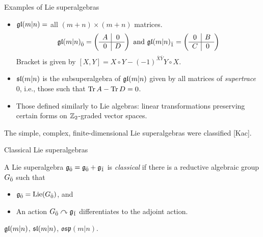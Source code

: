 \documentclass{beamer}
\begin{document}
\begin{frame}{Examples of Lie superalgebras}
  \begin{itemize}
    \pause
  \item $\gl(m|n) = $ all $(m+n) \times (m+n)$ matrices.
    \[
\even{\gl(m|n)} = \left(
  \begin{array}{c|c}
    A & 0 \\
    \hline
    0 & D
  \end{array}
\right)
\text{ and } \odd{\gl(m|n)} = \left(
  \begin{array}{c|c}
    0 & B \\
    \hline
    C & 0
  \end{array}
\right)
\]
\pause
  Bracket is given by $[X,Y] = X \circ Y - (-1)^{\bar X \bar Y} Y \circ X$.
  \pause\item $\sl(m|n)$ is the subsuperalgebra of $\gl(m|n)$ given by all matrices of \emph{supertrace} 0, i.e., those such that $\Tr A - \Tr D = 0$.
  \pause\item Those defined similarly to Lie algebras: linear transformations preserving certain forms on $\ZZ_2$-graded vector spaces.
  \end{itemize}
\pause
  The simple, complex, finite-dimensional Lie superalgebras were classified [Kac].
\end{frame}

\begin{frame}{Classical Lie superalgebras}\pause
  \begin{definition}
  A Lie superalgebra $\even{\g} = \even{\g} +\odd{\g}$ is \emph{classical} if there is a reductive algebraic group $\even{G}$ such that
  \begin{itemize}
  \item $\even{\g} = \Lie(\even{G})$, and
  \item An action $\even{G} \actson \odd{\g}$ differentiates to the adjoint action.
  \end{itemize}
  \end{definition}\pause
  \begin{example}
    $\gl(m|n)$, $\sl(m|n)$, $\mathfrak{osp}(m|n)$.
  \end{example}
\end{frame}
\end{document}
